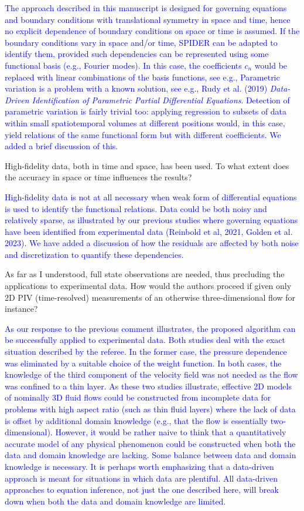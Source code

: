 \documentclass{article}
\newcommand{\response}{\textcolor{blue}}
\begin{document}
\medskip
\response{
The approach described in this manuscript is designed for governing equations and boundary conditions with translational symmetry in space and time, hence no explicit dependence of boundary conditions on space or time is assumed. If the boundary conditions vary in space and/or time, SPIDER can be adapted to identify them, provided such dependencies can be represented using some functional basis (e.g., Fourier modes). In this case, the coefficients $c_n$ would be replaced with linear combinations of the basis functions, see e.g., Parametric variation is a problem with a known solution, see e.g., Rudy et al. (2019) \textit{Data-Driven Identification of Parametric Partial Differential Equations}. Detection of parametric variation is fairly trivial too: applying regression to subsets of data within small spatiotemporal volumes at different positions would, in this case, yield relations of the same functional form but with different coefficients. We added a brief discussion of this.}
    
\medskip
High-fidelity data, both in time and space, has been used.  To what extent does the accuracy in space or time influences the results?
    
\medskip
\response{High-fidelity data is not at all necessary when weak form of differential equations is used to identify the functional relations. Data could be both noisy and relatively sparse, as illustrated by our previous studies where governing equations have been identified from experimental data (Reinbold et al, 2021, Golden et al. 2023). We have added a discussion of how the residuals are affected by both noise and discretization to quantify these dependencies.}
    
\medskip
As far as I understood, full state observations are needed, thus precluding the applications to experimental data.  How would the authors proceed if given only 2D PIV (time-resolved) measurements of an otherwise three-dimensional flow for instance?
    
\medskip
\response{
As our response to the previous comment illustrates, the proposed algorithm can be successfully applied to experimental data. Both studies deal with the exact situation described by the referee. In the former case, the pressure dependence was eliminated by a suitable choice of the weight function. In both cases, the knowledge of the third component of the velocity field was not needed as the flow was confined to a thin layer. As these two studies illustrate, effective 2D models of nominally 3D fluid flows could be constructed from incomplete data for problems with high aspect ratio (such as thin fluid layers) where the lack of data is offset by additional domain knowledge (e.g., that the flow is essentially two-dimensional). However, it would be rather naive to think that a quantitatively accurate model of any physical phenomenon could be constructed when both the data and domain knowledge are lacking. Some balance between data and domain knowledge is necessary. It is perhaps worth emphasizing that a data-driven approach is meant for situations in which data are plentiful. All data-driven approaches to equation inference, not just the one described here, will break down when both the data and domain knowledge are limited.}
    
\end{document}
